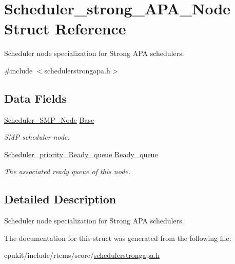 \hypertarget{structScheduler__strong__APA__Node}{}\section{Scheduler\+\_\+strong\+\_\+\+A\+P\+A\+\_\+\+Node Struct Reference}
\label{structScheduler__strong__APA__Node}


Scheduler node specialization for Strong A\+PA schedulers.  




{\ttfamily \#include $<$schedulerstrongapa.\+h$>$}

\subsection*{Data Fields}
\begin{DoxyCompactItemize}
\item 
\mbox{\label{structScheduler__strong__APA__Node_ae86cbf5fd8743267abe33bed6d8b0fe6}} 
\mbox{\hyperlink{structScheduler__SMP__Node}{Scheduler\+\_\+\+S\+M\+P\+\_\+\+Node}} \mbox{\hyperlink{structScheduler__strong__APA__Node_ae86cbf5fd8743267abe33bed6d8b0fe6}{Base}}
\begin{DoxyCompactList}\small\item\em S\+MP scheduler node. \end{DoxyCompactList}\item 
\mbox{\label{structScheduler__strong__APA__Node_a8db30da8cfbb4facd8ea88314843aa69}} 
\mbox{\hyperlink{structScheduler__priority__Ready__queue}{Scheduler\+\_\+priority\+\_\+\+Ready\+\_\+queue}} \mbox{\hyperlink{structScheduler__strong__APA__Node_a8db30da8cfbb4facd8ea88314843aa69}{Ready\+\_\+queue}}
\begin{DoxyCompactList}\small\item\em The associated ready queue of this node. \end{DoxyCompactList}\end{DoxyCompactItemize}


\subsection{Detailed Description}
Scheduler node specialization for Strong A\+PA schedulers. 

The documentation for this struct was generated from the following file\+:\begin{DoxyCompactItemize}
\item 
cpukit/include/rtems/score/\mbox{\hyperlink{schedulerstrongapa_8h}{schedulerstrongapa.\+h}}\end{DoxyCompactItemize}
